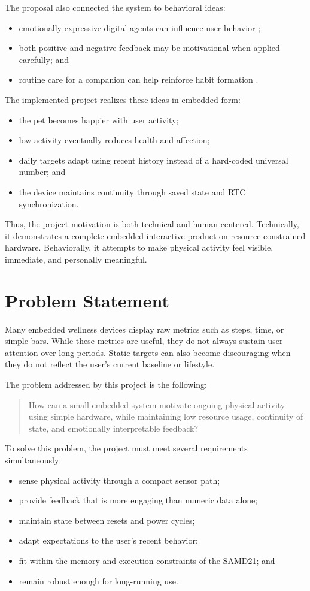 \documentclass[conference]{IEEEtran}
\begin{document}
The proposal also connected the system to behavioral ideas:
\begin{itemize}
\item emotionally expressive digital agents can influence user behavior \cite{byrne2012};
\item both positive and negative feedback may be motivational when applied carefully; and
\item routine care for a companion can help reinforce habit formation \cite{park2025,martins2023}.
\end{itemize}

The implemented project realizes these ideas in embedded form:
\begin{itemize}
\item the pet becomes happier with user activity;
\item low activity eventually reduces health and affection;
\item daily targets adapt using recent history instead of a hard-coded universal number; and
\item the device maintains continuity through saved state and RTC synchronization.
\end{itemize}

Thus, the project motivation is both technical and human-centered. Technically, it demonstrates a complete embedded interactive product on resource-constrained hardware. Behaviorally, it attempts to make physical activity feel visible, immediate, and personally meaningful.

\section{Problem Statement}
Many embedded wellness devices display raw metrics such as steps, time, or simple bars. While these metrics are useful, they do not always sustain user attention over long periods. Static targets can also become discouraging when they do not reflect the user's current baseline or lifestyle.

The problem addressed by this project is the following:
\begin{quote}
How can a small embedded system motivate ongoing physical activity using simple hardware, while maintaining low resource usage, continuity of state, and emotionally interpretable feedback?
\end{quote}

To solve this problem, the project must meet several requirements simultaneously:
\begin{itemize}
\item sense physical activity through a compact sensor path;
\item provide feedback that is more engaging than numeric data alone;
\item maintain state between resets and power cycles;
\item adapt expectations to the user's recent behavior;
\item fit within the memory and execution constraints of the SAMD21; and
\item remain robust enough for long-running use.
\end{itemize}
\end{document}
